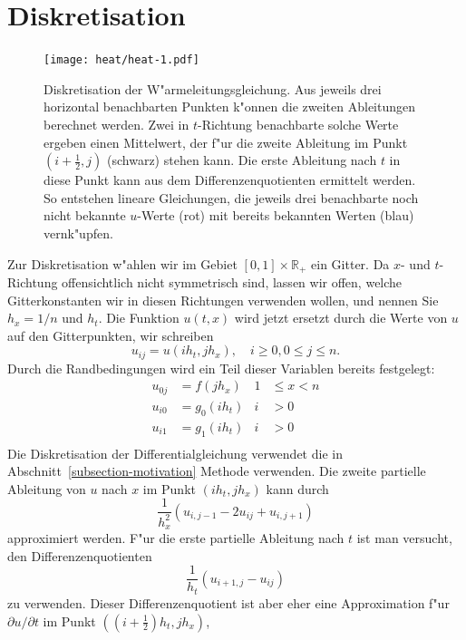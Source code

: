 \section{Diskretisation\label{heat:section-diskretisation}}
\begin{figure}
\begin{center}
\texttt{[image: heat/heat-1.pdf]}
\end{center}
\caption{Diskretisation der W"armeleitungsgleichung. 
Aus jeweils drei horizontal benachbarten Punkten k"onnen die zweiten
Ableitungen berechnet werden.
Zwei in $t$-Richtung benachbarte solche Werte ergeben einen Mittelwert,
der f"ur die zweite Ableitung im Punkt $(i+\frac12,j)$ (schwarz)
stehen kann. Die erste Ableitung nach $t$ in diese Punkt kann aus
dem Differenzenquotienten ermittelt werden. So entstehen lineare
Gleichungen, die jeweils drei benachbarte noch nicht bekannte
$u$-Werte (rot) mit bereits bekannten Werten (blau) vernk"upfen.
\label{heat:diskretisation1}}
\end{figure}
Zur Diskretisation w"ahlen wir im Gebiet $[0,1]\times \mathbb R_+$ ein
Gitter. 
Da $x$- und $t$-Richtung offensichtlich nicht symmetrisch sind,
lassen wir offen, welche Gitterkonstanten wir in diesen Richtungen
verwenden wollen, und nennen Sie $h_x=1/n$ und $h_t$. 
Die Funktion $u(t,x)$ wird jetzt ersetzt durch die Werte von $u$ auf
den Gitterpunkten, wir schreiben
\[
u_{ij} = u(ih_t, jh_x),\quad i\ge 0, 0\le j \le n.
\]
Durch die Randbedingungen wird ein Teil dieser Variablen bereits
festgelegt:
\begin{align*}
u_{0j}&=f(jh_x)&1&\le x < n\\
u_{i0}&=g_0(ih_t)&i&>0\\
u_{i1}&=g_1(ih_t)&i&>0\\
\end{align*}
Die Diskretisation der Differentialgleichung verwendet die in
Abschnitt~\ref{subsection-motivation} Methode verwenden.
Die zweite partielle Ableitung von $u$ nach $x$ im Punkt $(ih_t, jh_x)$ 
kann durch
\begin{equation}
\frac1{h_x^2}(u_{i,j-1}-2u_{ij}+u_{i,j+1})
\label{heat:2ableitung}
\end{equation}
approximiert werden.
F"ur die erste partielle Ableitung nach $t$ ist man versucht,
den Differenzenquotienten
\begin{equation}
\frac1{h_t}(u_{i+1,j}-u_{ij})
\label{heat:1ableitung}
\end{equation}
zu verwenden.
Dieser Differenzenquotient ist aber eher eine Approximation f"ur
$\partial u/\partial t$ im Punkt $((i+\frac12)h_t, jh_x)$,
